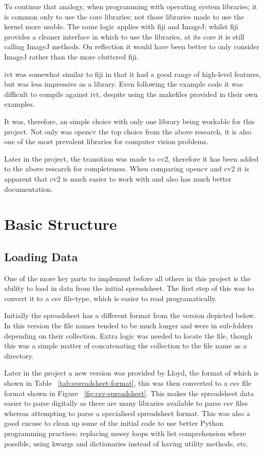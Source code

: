 To continue that analogy, when programming with operating system libraries; it is common only to 
use the core libraries; not those libraries made to use the kernel more usable. The same logic
applies with \gls{fiji} and ImageJ; whilst \gls{fiji} provides a cleaner interface in which to use
the libraries, at its core it is still calling ImageJ methods. On reflection it would have been 
better to only consider ImageJ rather than the more cluttered \gls{fiji}.


\gls{ivt} was somewhat similar to \gls{fiji} in that it had a good range of high-level features, 
but was less impressive as a library. Even following the example code it was difficult to 
compile against \gls{ivt}, despite using the makefiles provided in their own examples.

It was, therefore, an simple choice with only one library being workable for this project. Not only
was \gls{opencv} the top choice from the above research, it is also one of the most prevalent
libraries for computer vision problems.

Later in the project, the transition was made to \gls{cv2}, therefore it has been added to the
above research for completeness. When comparing \gls{opencv} and \gls{cv2} it is apparent that
\gls{cv2} is much easier to work with and also has much better documentation.

\section{Basic Structure}

\subsection{Loading Data}
One of the more key parts to implement before all others in this project is the ability to load in
data from the initial spreadsheet. The first step of this was to convert it to a \gls{csv} 
file-type, which is easier to read programatically.

Initially the spreadsheet has a different format from the version depicted below. In this version 
the file names tended to be much longer and were in sub-folders depending on their collection. 
Extra logic was needed to locate the file, though this was a simple matter of concatenating the 
collection to the file name as a directory. 

Later in the project a new version was provided by Lloyd, the format of which is shown in Table~
\ref{tab:spreadsheet-format}, this was then converted to a \gls{csv} file format shown in Figure~
\ref{fig:csv-spreadsheet}. This makes the spreadsheet data easier to parse digitally as there are
many libraries available to parse \gls{csv} files whereas attempting to parse a specialised 
spreadsheet format. This was also a good excuse to clean up some of the initial code to 
use better Python programming practises; replacing messy loops with list comprehension where 
possible, using \gls{kwargs} and dictionaries instead of having utility methods, etc.

